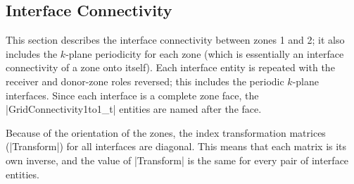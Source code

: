 \subsection{Interface Connectivity}

This section describes the interface connectivity between zones 1 and
2; it also includes the $k$-plane periodicity for each zone (which is
essentially an interface connectivity of a zone onto itself).  Each
interface entity is repeated with the receiver and donor-zone roles
reversed; this includes the periodic $k$-plane interfaces.  Since each
interface is a complete zone face, the |GridConnectivity1to1_t| entities
are named after the face.

Because of the orientation of the zones, the index transformation
matrices (|Transform|) for all interfaces are diagonal.  This means that
each matrix is its own inverse, and the value of |Transform| is the same
for every pair of interface entities.
